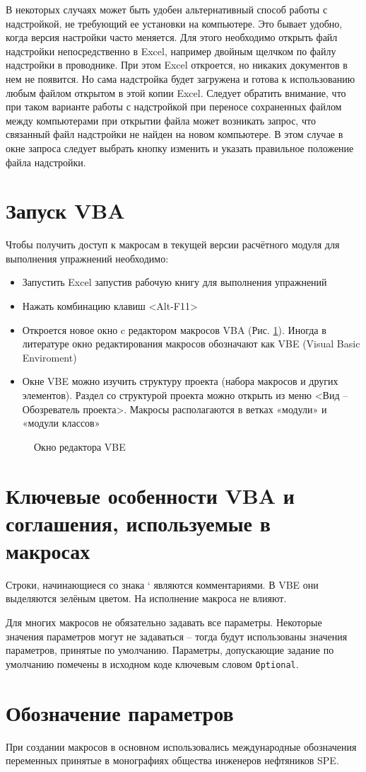 В некоторых случаях может быть удобен альтернативный способ работы с надстройкой, не требующий ее установки на компьютере. Это бывает удобно, когда версия настройки часто меняется. Для этого необходимо открыть файл надстройки непосредственно в Excel, например двойным щелчком по файлу надстройки в проводнике. При этом Excel откроется, но никаких документов в нем не появится. Но сама надстройка будет загружена и готова к использованию любым файлом открытом в этой копии Excel. Следует обратить внимание, что при таком варианте работы с надстройкой при переносе сохраненных файлом между компьютерами при открытии файла может возникать запрос, что связанный файл надстройки не найден на новом компьютере. В этом случае в окне запроса следует выбрать кнопку изменить и указать правильное положение файла надстройки.


\section{Запуск VBA}

Чтобы получить доступ к макросам в текущей версии расчётного модуля для выполнения упражнений необходимо:
\begin{itemize}
	\item Запустить Excel запустив рабочую книгу для выполнения упражнений
	\item Нажать комбинацию клавиш <Alt-F11>
	\item Откроется новое окно c редактором макросов VBA (Рис. \ref{ris:VBA_overview}). Иногда в литературе окно редактирования макросов обозначают как VBE (Visual Basic Enviroment)
	\item Окне VBE можно изучить структуру проекта (набора макросов и других элементов). Раздел со структурой проекта можно открыть из меню <Вид – Обозреватель проекта>. Макросы располагаются в ветках «модули» и «модули классов»
	 
\end{itemize}

\begin{figure}[ht]
	\caption{Окно редактора VBE}
	\label{ris:VBA_overview}
\end{figure}

\section{Ключевые особенности VBA и соглашения, используемые в макросах}
Строки, начинающиеся со знака ‘ являются комментариями. В VBE они выделяются зелёным цветом. На исполнение макроса не влияют.

Для многих макросов не обязательно задавать все параметры. Некоторые значения параметров могут не задаваться – тогда будут использованы значения параметров, принятые по умолчанию. Параметры, допускающие задание по умолчанию помечены в исходном коде ключевым словом \texttt{Optional}.

\section{Обозначение параметров}
При создании макросов в основном использовались международные обозначения переменных принятые в монографиях общества инженеров нефтяников SPE.
